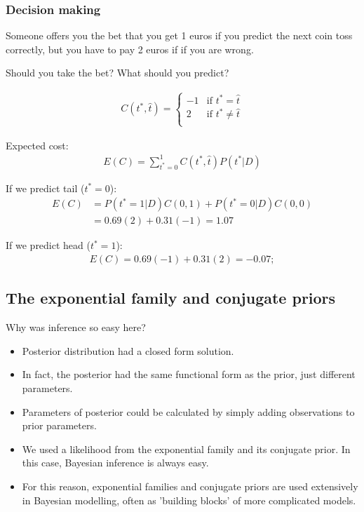 \subsubsection{Decision making}
Someone offers you the bet that you get 1 euros if you predict the next coin toss correctly, but you have to pay 2 euros if if you are wrong. 

Should you take the bet? What should you predict?

\begin{align}
C(t^*,\hat t)=
\begin{cases}
-1 &\mbox{if~} t^*= \hat t\\
2 &\mbox{if~} t^*\neq \hat t\\
\end{cases}
\end{align}

Expected cost: 
\begin{align}
E(C)=\sum_{t^*=0}^1 C(t^*,\hat t) P(t^*| D)
\end{align}

If we predict tail ($t^*=0$): 
\begin{align}
E(C)&= P(t^*=1|D) C(0,1)+P(t^*=0|D) C(0,0)  \\
&=0.69 (2)  + 0.31 (-1)= 1.07
\end{align}

If we predict head ($t^*=1$): 
\begin{align}
E(C)=0.69 (-1)  + 0.31 (2)= -0.07;
\end{align}

\subsection{The exponential family and conjugate priors}
Why was inference so easy here?

\begin{itemize}
\item Posterior distribution had a closed form solution.
\item In fact, the posterior had the same functional form as the prior, just different parameters.
\item Parameters of posterior could be calculated by simply adding observations to prior parameters.
\item We used a likelihood from the {exponential family} and its {conjugate prior}. In this case,  Bayesian inference is always easy.
\item For this reason, exponential families and conjugate priors are used extensively in Bayesian modelling, often as 'building blocks' of more complicated models.
\end{itemize}


